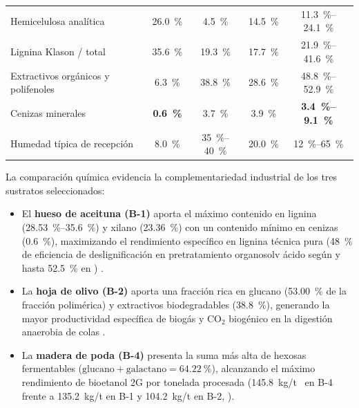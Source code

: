 \documentclass{report}
\begin{document}
\begin{table}[H]
{\begin{tabular}{l c c c | c}
            Hemicelulosa analítica                            & \SI{26.0}{\percent}           & \SI{4.5}{\percent}           & \SI{14.5}{\percent}        & \SI{11.3}{\percent}--\SI{24.1}{\percent} \\
            Lignina Klason / total                            & \SI{35.6}{\percent}           & \SI{19.3}{\percent}          & \SI{17.7}{\percent}        & \SI{21.9}{\percent}--\SI{41.6}{\percent} \\
            Extractivos orgánicos y polifenoles               & \SI{6.3}{\percent}            & \SI{38.8}{\percent}          & \SI{28.6}{\percent}        & \SI{48.8}{\percent}--\SI{52.9}{\percent} \\
            Cenizas minerales                                 & \textbf{\SI{0.6}{\percent}}   & \SI{3.7}{\percent}           & \SI{3.9}{\percent}         & \textbf{\SI{3.4}{\percent}--\SI{9.1}{\percent}} \\
            Humedad típica de recepción                       & \SI{8.0}{\percent}            & \SI{35}{\percent}--\SI{40}{\percent} & \SI{20.0}{\percent} & \SI{12}{\percent}--\SI{65}{\percent} \\
            \bottomrule
        \end{tabular}%
    }
    \label{tab:composicion_comparada}
\end{table}

La comparación química evidencia la complementariedad industrial de los tres sustratos seleccionados:
\begin{itemize}
    \item El \textbf{hueso de aceituna (B-1)} aporta el máximo contenido en lignina (\SI{28.53}{\percent}--\SI{35.6}{\percent}) y xilano (\SI{23.36}{\percent}) con un contenido mínimo en cenizas (\SI{0.6}{\percent}), maximizando el rendimiento específico en lignina técnica pura (\SI{48}{\percent} de eficiencia de deslignificación en pretratamiento organosolv ácido según \textcite[Sección~3.1]{Jafari-Gohargan2026} y hasta \SI{52.5}{\percent} en \textcite[Tabla~1]{Padilla-Rascon2022}) \autocite{MacArez2025}.
    \item La \textbf{hoja de olivo (B-2)} aporta una fracción rica en glucano (\SI{53.00}{\percent} de la fracción polimérica) y extractivos biodegradables (\SI{38.8}{\percent}), generando la mayor productividad específica de biogás y $\text{CO}_2$ biogénico en la digestión anaerobia de colas \autocite[Sección~3.1 y Tabla~8]{Jafari-Gohargan2026}.
    \item La \textbf{madera de poda (B-4)} presenta la suma más alta de hexosas fermentables ($\text{glucano} + \text{galactano} = \SI{64.22}{\percent}$), alcanzando el máximo rendimiento de bioetanol 2G por tonelada procesada (\SI{145.8}{\kilo\gram/\tonne{}} en B-4 frente a \SI{135.2}{\kilo\gram/\tonne} en B-1 y \SI{104.2}{\kilo\gram/\tonne} en B-2, \textcite[Tabla~8]{Jafari-Gohargan2026}).
\end{itemize}
\end{document}
